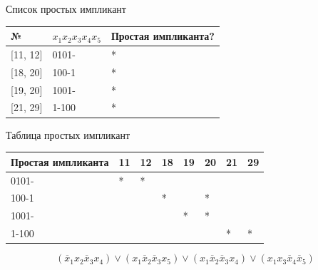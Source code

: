 Список простых импликант

\begin{longtable}[]{@{}lll@{}}
\toprule
№ & \(x_1x_2x_3x_4x_5\) & Простая импликанта?\tabularnewline
\midrule
\endhead
{[}11, 12{]} & 0101- & *\tabularnewline
{[}18, 20{]} & 100-1 & *\tabularnewline
{[}19, 20{]} & 1001- & *\tabularnewline
{[}21, 29{]} & 1-100 & *\tabularnewline
\bottomrule
\end{longtable}

Таблица простых импликант

\begin{longtable}[]{@{}llllllll@{}}
\toprule
Простая импликанта & 11 & 12 & 18 & 19 & 20 & 21 & 29\tabularnewline
\midrule
\endhead
0101- & * & * & & & & &\tabularnewline
100-1 & & & * & & * & &\tabularnewline
1001- & & & & * & * & &\tabularnewline
1-100 & & & & & & * & *\tabularnewline
\bottomrule
\end{longtable}

\[( \overline x_1x_2\overline x_3x_4 ) \lor ( x_1\overline x_2\overline x_3x_5 ) \lor ( x_1\overline x_2\overline x_3x_4 ) \lor ( x_1x_3\overline x_4\overline x_5 )\]

